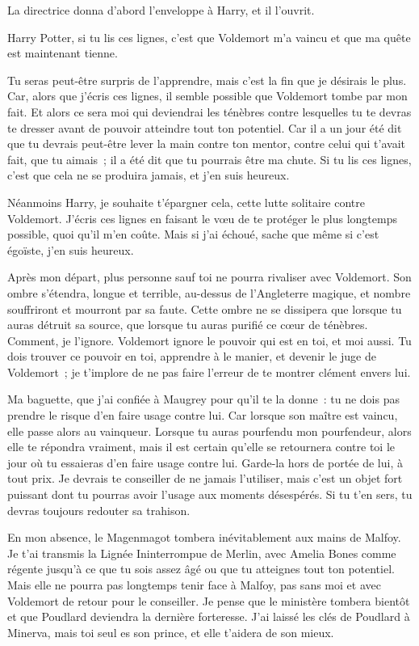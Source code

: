 La directrice donna d'abord l'enveloppe à Harry, et il l'ouvrit.

\later
\begin{writtenNote}
Harry Potter, si tu lis ces lignes, c'est que Voldemort m'a vaincu et que ma quête est maintenant tienne.

Tu seras peut-être surpris de l'apprendre, mais c'est la fin que je désirais le plus.
Car, alors que j'écris ces lignes, il semble possible que Voldemort tombe par mon fait.
Et alors ce sera moi qui deviendrai les ténèbres contre lesquelles tu te devras te dresser avant de pouvoir atteindre tout ton potentiel.
Car il a un jour été dit que tu devrais peut-être lever la main contre ton mentor, contre celui qui t'avait fait, que tu aimais~; il a été dit que tu pourrais être ma chute.
Si tu lis ces lignes, c'est que cela ne se produira jamais, et j'en suis heureux.

Néanmoins Harry, je souhaite t'épargner cela, cette lutte solitaire contre Voldemort.
J'écris ces lignes en faisant le vœu de te protéger le plus longtemps possible, quoi qu'il m'en coûte.
Mais si j'ai échoué, sache que même si c'est égoïste, j'en suis heureux.

Après mon départ, plus personne sauf toi ne pourra rivaliser avec Voldemort.
Son ombre s'étendra, longue et terrible, au-dessus de l'Angleterre magique, et nombre souffriront et mourront par sa faute.
Cette ombre ne se dissipera que lorsque tu auras détruit sa source, que lorsque tu auras purifié ce cœur de ténèbres.
Comment, je l'ignore.
Voldemort ignore le pouvoir qui est en toi, et moi aussi.
Tu dois trouver ce pouvoir en toi, apprendre à le manier, et devenir le juge de Voldemort~; je t'implore de ne pas faire l'erreur de te montrer clément envers lui.

Ma baguette, que j'ai confiée à Maugrey pour qu'il te la donne~: tu ne dois pas prendre le risque d'en faire usage contre lui.
Car lorsque son maître est vaincu, elle passe alors au vainqueur.
Lorsque tu auras pourfendu mon pourfendeur, alors elle te répondra vraiment, mais il est certain qu'elle se retournera contre toi le jour où tu essaieras d'en faire usage contre lui.
Garde-la hors de portée de lui, à tout prix.
Je devrais te conseiller de ne jamais l'utiliser, mais c'est un objet fort puissant dont tu pourras avoir l'usage aux moments désespérés.
Si tu t'en sers, tu devras toujours redouter sa trahison.

En mon absence, le Magenmagot tombera inévitablement aux mains de Malfoy.
Je t'ai transmis la Lignée Ininterrompue de Merlin, avec Amelia Bones comme régente jusqu'à ce que tu sois assez âgé ou que tu atteignes tout ton potentiel.
Mais elle ne pourra pas longtemps tenir face à Malfoy, pas sans moi et avec Voldemort de retour pour le conseiller.
Je pense que le ministère tombera bientôt et que Poudlard deviendra la dernière forteresse.
J'ai laissé les clés de Poudlard à Minerva, mais toi seul es son prince, et elle t'aidera de son mieux.


\end{writtenNote}
